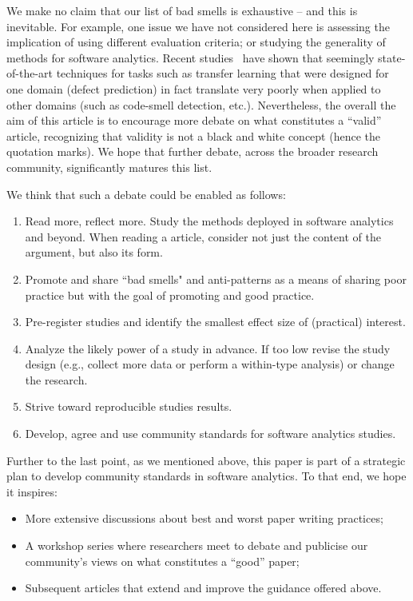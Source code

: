 \documentclass[preprint,10pt]{elsarticle}
\newcommand{\bi}{\begin{itemize}}
\newcommand{\ei}{\end{itemize}}
\begin{document}
We make no claim that our  list of bad smells is exhaustive --  and this is inevitable. For example, one issue we have not considered here is assessing the implication of using different evaluation criteria; or studying the generality of methods for software analytics.  Recent studies~\cite{krishna18a} have shown that seemingly state-of-the-art techniques for tasks such as transfer learning that were designed for one domain (defect prediction) in fact translate very poorly when applied to other domains (such as code-smell detection, etc.).
Nevertheless, the overall the aim of this article is to encourage more debate on what constitutes a ``valid'' article, recognizing that validity is not a black and white concept (hence the quotation marks).  We hope that further debate, across the broader research community, significantly matures this list.

We think that such a debate could be enabled as follows:
\begin{enumerate}
    \item Read more, reflect more. Study the methods deployed in software analytics and beyond.%
    When reading a article, consider not just the content of the argument, but also its form.
    \item Promote and share ``bad smells" and anti-patterns as a means of sharing poor practice but with the goal of promoting and good practice.
    \item Pre-register studies and identify the smallest effect size of (practical) interest.
    \item Analyze the likely power of a study in advance. If too low  revise the study design (e.g., collect more data or perform a within-type analysis) or change the research.
    \item Strive toward reproducible studies
    results.
     \item Develop, agree and use community standards  for software analytics studies.
     \end{enumerate}
Further to the last point, as we mentioned above, this paper is part of a strategic plan to develop community standards in software analytics.  To that end, we hope it inspires:
     \bi
     \item More  extensive discussions about best and worst paper writing practices; 
\item A workshop series where researchers meet to debate and publicise our community's views on what constitutes a ``good''  paper;
\item Subsequent articles
that extend and improve the guidance offered above.
\ei
  
\end{document}
